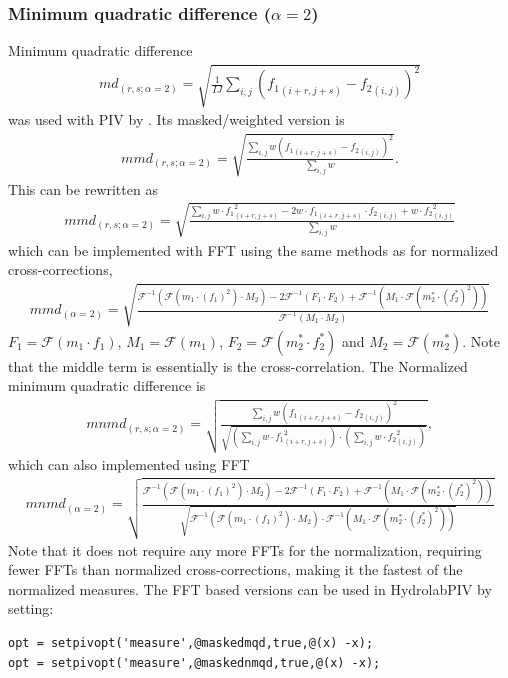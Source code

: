 \documentclass[10pt]{article}
\newcommand{\FT}{\ensuremath{\mathcal F}}
\newcommand{\iFT}{\ensuremath{\mathcal F^{-1}}}
\begin{document}
\subsubsection{Minimum quadratic difference ($\alpha=2$)}
Minimum quadratic difference 
   \begin{align*}
		md_{(r,s;\alpha=2)} = \sqrt{\frac{1}{IJ}\sum_{i,j} \left({f_1}_{(i+r,j+s)}-{f_2}_{(i,j)}\right)^2}
   \end{align*}
was used with PIV by \cite{Gui1998}.
Its masked/weighted version is
\begin{align*}
		mmd_{(r,s;\alpha=2)} = \sqrt{\frac{\sum_{i,j} w\left({f_1}_{(i+r,j+s)}-{f_2}_{(i,j)}\right)^2}
		{ \sum_{i,j} w}}.
\end{align*}
This can be rewritten as
\begin{align*}
		mmd_{(r,s;\alpha=2)} = \sqrt{\frac{\sum_{i,j} w\cdot {f_1}_{(i+r,j+s)}^2 -2w\cdot{f_1}_{(i+r,j+s)}\cdot{f_2}_{(i,j)}  + w\cdot{f_2}_{(i,j)}^2 }
		{ \sum_{i,j} w}}
\end{align*}
which can be implemented with FFT using the same methods as for normalized cross-corrections,
\begin{align*}
	 mmd_{(\alpha=2)} = \sqrt{\frac{\iFT(\FT(m_1\cdot(f_1)^2)\cdot M_2) - 2\iFT(F_1\cdot F_2) + \iFT(M_1\cdot\FT(m_2^*\cdot(f^*_2)^2))}
	 {\iFT\left(M_1\cdot M_2\right)}}
\end{align*}  
$F_1=\FT(m_1\cdot f_1)$, $M_1=\FT(m_1)$, $F_2=\FT(m_2^*\cdot f_2^*)$ and $M_2=\FT(m_2^*)$.
Note that the middle term is essentially is the cross-correlation. The Normalized minimum quadratic difference is
\begin{align*}
		mnmd_{(r,s;\alpha=2)} = \sqrt{\frac{\sum_{i,j} w\left({f_1}_{(i+r,j+s)}-{f_2}_{(i,j)}\right)^2}
		{ \sqrt{\left(\sum_{i,j} w\cdot{f_1}_{(i+r,j+s)}^2\right)\cdot\left(\sum_{i,j} w\cdot{f_2}_{(i,j)}^2\right)}}},
\end{align*}
which can also implemented using FFT
\begin{align*}
	 mnmd_{(\alpha=2)} = \sqrt{\frac{\iFT(\FT(m_1\cdot(f_1)^2)\cdot M_2) - 2\iFT(F_1\cdot F_2) + \iFT(M_1\cdot\FT(m_2^*\cdot(f^*_2)^2))}
	 {\sqrt{\iFT(\FT(m_1\cdot(f_1)^2)\cdot M_2) \cdot \iFT(M_1\cdot\FT(m_2^*\cdot(f^*_2)^2))}}}
\end{align*}
Note that it does not require any more FFTs for the normalization, requiring fewer FFTs than normalized cross-corrections, 
making it the fastest of the normalized measures. The FFT based versions can be used in HydrolabPIV by setting:
\begin{lstlisting}
opt = setpivopt('measure',@maskedmqd,true,@(x) -x);
opt = setpivopt('measure',@maskednmqd,true,@(x) -x);   
\end{lstlisting}
\end{document}
